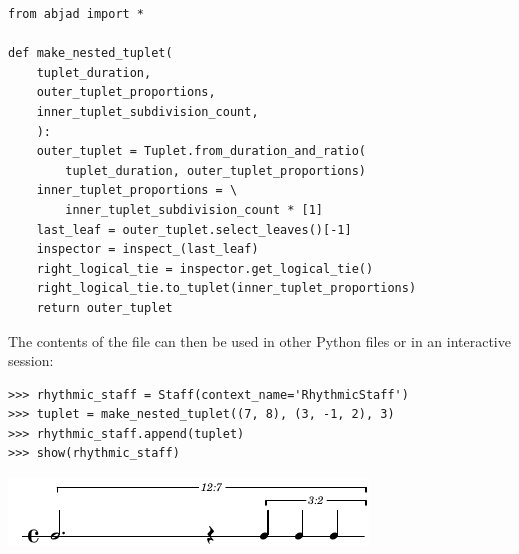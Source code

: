 \documentclass{article}
\begin{document}

\begin{lstlisting}
from abjad import *

def make_nested_tuplet(
    tuplet_duration,
    outer_tuplet_proportions,
    inner_tuplet_subdivision_count,
    ):
    outer_tuplet = Tuplet.from_duration_and_ratio(
        tuplet_duration, outer_tuplet_proportions)
    inner_tuplet_proportions = \
        inner_tuplet_subdivision_count * [1]
    last_leaf = outer_tuplet.select_leaves()[-1]
    inspector = inspect_(last_leaf)
    right_logical_tie = inspector.get_logical_tie()
    right_logical_tie.to_tuplet(inner_tuplet_proportions)
    return outer_tuplet
\end{lstlisting}

\noindent The contents of the file can then be used in other Python files or in
an interactive session:

\begin{lstlisting}
>>> rhythmic_staff = Staff(context_name='RhythmicStaff')
>>> tuplet = make_nested_tuplet((7, 8), (3, -1, 2), 3)
>>> rhythmic_staff.append(tuplet)
>>> show(rhythmic_staff)
\end{lstlisting}
\includegraphics{assets/lilypond-a8fcfb8f401a81a10afeb01a4f9f03ab.pdf}
\end{document}
